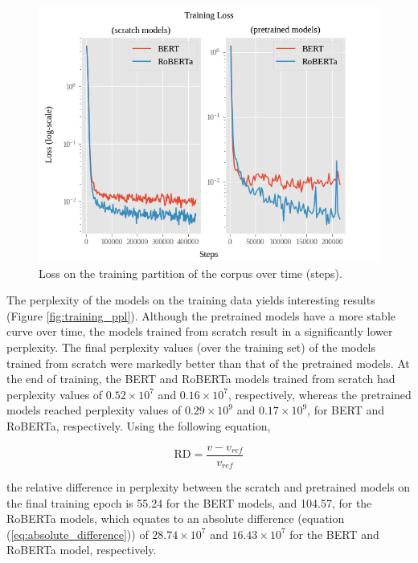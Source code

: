 \documentclass[12pt]{article}
\begin{document}
\begin{figure}[!t]
    \includegraphics[width=\linewidth]{figures/training_loss.png}
    \caption{Loss on the training partition of the corpus over time (steps).}
    \label{fig:training_loss}
\end{figure}

The perplexity of the models on the training data yields interesting results (Figure \ref{fig:training_ppl}). Although the pretrained models have a more stable curve over time, the models trained from scratch result in a significantly lower perplexity. The final perplexity values (over the training set) of the models trained from scratch were markedly better than that of the pretrained models. At the end of training, the BERT and RoBERTa models trained from scratch had perplexity values of $0.52\times 10^7$ and $0.16\times 10^7$, respectively, whereas the pretrained models reached perplexity values of $0.29\times 10^9$ and $0.17\times 10^9$, for BERT and RoBERTa, respectively. Using the following equation,

\begin{equation}\label{eq:relative_difference}
    \mbox{RD} = \frac{v - v_{ref}}{v_{ref}}
\end{equation}

\noindent
the relative difference in perplexity between the scratch and pretrained models on the final training epoch is 55.24 for the BERT models, and 104.57, for the RoBERTa models, which equates to an absolute difference (equation (\ref{eq:absolute_difference})) of $28.74 \times 10^7$ and $16.43 \times 10^7$ for the BERT and RoBERTa model, respectively.
\end{document}
